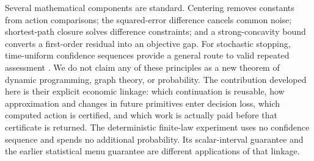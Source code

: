 Several mathematical components are standard. Centering removes constants
from action comparisons; the squared-error difference cancels common noise;
shortest-path closure solves difference constraints; and a strong-concavity
bound converts a first-order residual into an objective gap. For stochastic
stopping, time-uniform confidence sequences provide a general route to valid
repeated assessment \citep{howard2021}. We do not claim any of these principles
as a new theorem of dynamic programming, graph theory, or probability. The
contribution developed here is their explicit economic linkage: which
continuation is reusable, how approximation and changes in future primitives
enter decision loss, which computed action is certified, and which work is
actually paid before that certificate is returned. The deterministic finite-law
experiment uses no confidence sequence and spends no additional probability.
Its scalar-interval guarantee and the earlier statistical menu guarantee
are different applications of that linkage.
